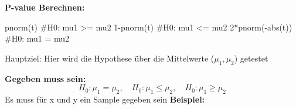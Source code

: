 \textbf{P-value Berechnen:}
\begin{rcode}{1}
pnorm(t) #H0: mu1 >= mu2
1-pnorm(t) #H0: mu1 <= mu2
2*pnorm(-abs(t)) #H0: mu1 = mu2
\end{rcode}

\columnbreak
\normalsize
\begin{center}
\normalsize
Hauptziel: Hier wird die Hypothese über die
Mittelwerte ($\mu_1, \mu_2$) getestet
\end{center}
\normalsize
\begin{center}
\end{center}

\large{\textbf{Gegeben muss sein:}}
\[
H_0: \mu_1 = \mu_2, \quad 
H_0: \mu_1 \leq \mu_2, \quad 
H_0: \mu_1 \geq \mu_2
\]
\textcolor{red}{\warning} Es muss für x und y ein Sample gegeben sein \textcolor{red}{\warning}
\large{\textbf{Beispiel:}}
\begin{comment}
\[
\begin{array}{|c|l|}
\hline
\textbf{Symbol} & \textbf{Bedeutung} \\
\hline
n_1,\,n_2 & \text{Stichprobengrößen} \\
\overline{X}_{(n_1)},\,\overline{Y}_{(n_2)} & \text{Sample Means} \\
S^2_{X,n_1},\, S^2_{Y,n_2} & \text{Sample SDs} \\
\hline
\end{array}
\]

\normalsize

\large{\textbf{Pooled Sample Variance:}}
\[
S_p^2 \;=\; 
\dfrac{(n_1 - 1)\,S_{X,n_1}^2 + (n_2 - 1)\,S_{Y,n_2}^2}
{n_1 + n_2 - 2}
\]

\large{\textbf{Teststatistik:}}
\[
T = \dfrac{\overline{X}_{(n_1)} - \overline{Y}_{(n_2)} \;-\; (\mu_1 - \mu_2)}
{S_p\,\sqrt{\dfrac{n_1 + n_2}{n_1\,n_2}}}
\;\;\sim t_{\,n_1 + n_2 - 2}
\]

\large{\textbf{Decision Rule \(R\):}}
\[
T \in R \implies \text{reject } H_0
\]

\large{\textbf{Rejection Region \(R\):}}
\[
\begin{array}{|c|c|}
\hline
H_0 & \text{Rejection Region } R \\ \hline
\mu_1 = \mu_2 
  & (-\infty,\,-t_{n_1+n_2-2,\,1-\tfrac{\alpha}{2}}) \cup (t_{n_1+n_2-2,\,1-\tfrac{\alpha}{2}},\,\infty) \\ \hline
\mu_1 \leq \mu_2 
  & (t_{n_1+n_2-2,\,1-\alpha},\,\infty) \\ \hline
\mu_1 \geq \mu_2 
  & (-\infty,\,-t_{n_1+n_2-2,\,1-\alpha}) \\ \hline
\end{array}
\]
\end{comment}
